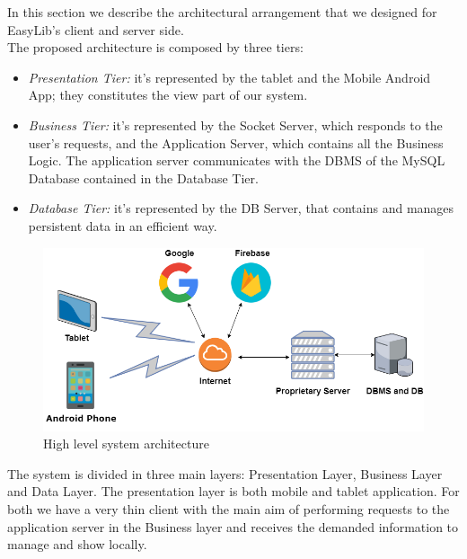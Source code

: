 \vspace*{-5mm}

In this section we describe the architectural arrangement that we designed for EasyLib’s client and server side.\\

The proposed architecture is composed by three tiers:

\begin{itemize}
\item \emph{Presentation Tier:} it’s represented by the tablet and the Mobile Android App;  they constitutes the view part of our system.
\item \emph{Business Tier:} it’s represented by the Socket Server, which responds to the user’s requests, and the Application Server, which contains all the Business Logic. The application server communicates with the DBMS of the MySQL Database contained in the Database Tier.
\item \emph{Database Tier:} it’s represented by the DB Server, that contains and manages persistent data in an efficient way.
\end{itemize}

\vspace*{0cm}
\begin{figure}[H]
	\centering
	\includegraphics[scale=0.5]{Images/Diagrams/High_level_System_Architecture}
	\caption{High level system architecture}
\end{figure}

\newpage
{}
The system is divided in three main layers: Presentation Layer, Business Layer and Data Layer. The presentation layer is both mobile and tablet application. For both we have a very thin client with the main aim of performing requests to the application server in the Business layer and receives the demanded information to manage and show locally.

